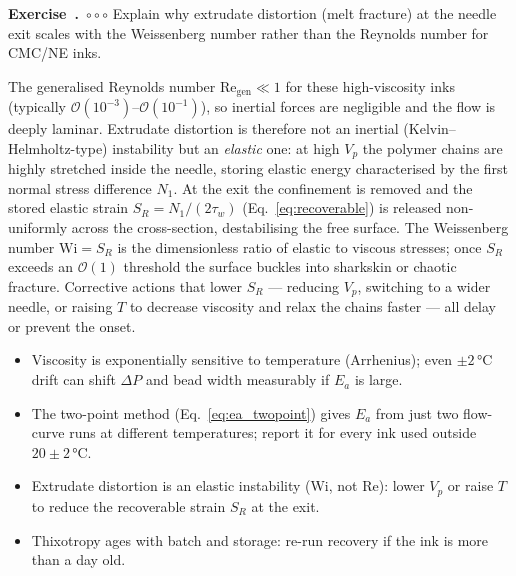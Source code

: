 \documentclass[11pt,a4paper]{article}
\newcommand{\diffC}{\textcolor{red!70!black}{$\circ\circ\circ$}}
\newcounter{exidx}[section]
\renewcommand{\theexidx}{\thesection.\arabic{exidx}}
\newenvironment{exercise}[1]%
  {\par\smallskip\refstepcounter{exidx}%
   \noindent\textbf{Exercise~\theexidx}~#1\quad}
  {\par\smallskip}
\newcommand{\Rey}{\mathrm{Re}}
\begin{document}
\begin{exercise}{\diffC}
Explain why extrudate distortion (melt fracture) at the needle exit
scales with the Weissenberg number rather than the Reynolds number for
CMC/NE inks.

\begin{solution}
The generalised Reynolds number $\Rey_\mathrm{gen}\ll1$ for these
high-viscosity inks (typically $\mathcal{O}(10^{-3})$--$\mathcal{O}(10^{-1})$),
so inertial forces are negligible and the flow is deeply laminar.
Extrudate distortion is therefore not an inertial (Kelvin--Helmholtz-type)
instability but an \emph{elastic} one: at high $V_p$ the polymer chains
are highly stretched inside the needle, storing elastic energy
characterised by the first normal stress difference $N_1$. At the exit
the confinement is removed and the stored elastic strain
$S_R = N_1/(2\tau_w)$ (Eq.~\ref{eq:recoverable}) is released
non-uniformly across the cross-section, destabilising the free surface.
The Weissenberg number $\mathrm{Wi} = S_R$ is the dimensionless ratio of
elastic to viscous stresses; once $S_R$ exceeds an $\mathcal{O}(1)$
threshold the surface buckles into sharkskin or chaotic fracture.
Corrective actions that lower $S_R$ --- reducing $V_p$, switching to a
wider needle, or raising $T$ to decrease viscosity and relax the chains
faster --- all delay or prevent the onset.
\end{solution}
\end{exercise}

\begin{takeawaybox}
\begin{itemize}[leftmargin=1.4em,itemsep=2pt]
\item Viscosity is exponentially sensitive to temperature (Arrhenius);
  even $\pm2\,\si{\celsius}$ drift can shift $\Delta P$ and bead width
  measurably if $E_a$ is large.
\item The two-point method (Eq.~\ref{eq:ea_twopoint}) gives $E_a$ from
  just two flow-curve runs at different temperatures; report it for every
  ink used outside $20\pm2\,\si{\celsius}$.
\item Extrudate distortion is an elastic instability (Wi, not Re): lower
  $V_p$ or raise $T$ to reduce the recoverable strain $S_R$ at the exit.
\item Thixotropy ages with batch and storage: re-run recovery if the ink
  is more than a day old.
\end{itemize}
\end{takeawaybox}
\end{document}
